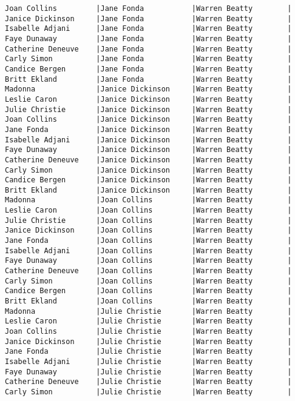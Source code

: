\documentclass{article}
\begin{document}
\begin{verbatim}
Joan Collins         |Jane Fonda           |Warren Beatty        |
Janice Dickinson     |Jane Fonda           |Warren Beatty        |
Isabelle Adjani      |Jane Fonda           |Warren Beatty        |
Faye Dunaway         |Jane Fonda           |Warren Beatty        |
Catherine Deneuve    |Jane Fonda           |Warren Beatty        |
Carly Simon          |Jane Fonda           |Warren Beatty        |
Candice Bergen       |Jane Fonda           |Warren Beatty        |
Britt Ekland         |Jane Fonda           |Warren Beatty        |
Madonna              |Janice Dickinson     |Warren Beatty        |
Leslie Caron         |Janice Dickinson     |Warren Beatty        |
Julie Christie       |Janice Dickinson     |Warren Beatty        |
Joan Collins         |Janice Dickinson     |Warren Beatty        |
Jane Fonda           |Janice Dickinson     |Warren Beatty        |
Isabelle Adjani      |Janice Dickinson     |Warren Beatty        |
Faye Dunaway         |Janice Dickinson     |Warren Beatty        |
Catherine Deneuve    |Janice Dickinson     |Warren Beatty        |
Carly Simon          |Janice Dickinson     |Warren Beatty        |
Candice Bergen       |Janice Dickinson     |Warren Beatty        |
Britt Ekland         |Janice Dickinson     |Warren Beatty        |
Madonna              |Joan Collins         |Warren Beatty        |
Leslie Caron         |Joan Collins         |Warren Beatty        |
Julie Christie       |Joan Collins         |Warren Beatty        |
Janice Dickinson     |Joan Collins         |Warren Beatty        |
Jane Fonda           |Joan Collins         |Warren Beatty        |
Isabelle Adjani      |Joan Collins         |Warren Beatty        |
Faye Dunaway         |Joan Collins         |Warren Beatty        |
Catherine Deneuve    |Joan Collins         |Warren Beatty        |
Carly Simon          |Joan Collins         |Warren Beatty        |
Candice Bergen       |Joan Collins         |Warren Beatty        |
Britt Ekland         |Joan Collins         |Warren Beatty        |
Madonna              |Julie Christie       |Warren Beatty        |
Leslie Caron         |Julie Christie       |Warren Beatty        |
Joan Collins         |Julie Christie       |Warren Beatty        |
Janice Dickinson     |Julie Christie       |Warren Beatty        |
Jane Fonda           |Julie Christie       |Warren Beatty        |
Isabelle Adjani      |Julie Christie       |Warren Beatty        |
Faye Dunaway         |Julie Christie       |Warren Beatty        |
Catherine Deneuve    |Julie Christie       |Warren Beatty        |
Carly Simon          |Julie Christie       |Warren Beatty        |

\end{verbatim}
\end{document}
